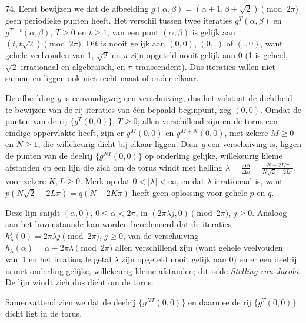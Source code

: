 \begin{problem}{74.}
    Eerst bewijzen we dat de afbeelding $g(\alpha,\beta) = (\alpha + 1,\beta + \sqrt{2}) \pmod {2 \pi}$ geen periodieke punten heeft. Het verschil tussen twee ite\-raties $g^T(\alpha,\beta)$ en $g^{T + t}(\alpha,\beta)$, $T \geq 0$ en $t \geq 1$, van een punt $(\alpha,\beta)$ is gelijk aan $(t,t \sqrt{2}) \pmod {2 \pi}$. Dit is nooit gelijk aan $(0,0)$, $(0,.)$ of $(.,0)$, want gehele veelvouden van 1, $\sqrt{2}$ en $\pi$ zijn opgeteld nooit gelijk aan 0 (1 is geheel, $\sqrt{2}$ irrationaal en algebraïsch, en $\pi$ transcendent). Dus iteraties vallen niet samen, en liggen ook niet recht naast of onder elkaar.

    De afbeelding $g$ is eenvoudigweg een verschuiving, dus het volstaat de dichtheid te bewijzen van de rij iteraties van één bepaald beginpunt, zeg $(0,0)$. Omdat de punten van de rij $\{g^T(0,0)\}$, $T \geq 0$, allen verschil\-lend zijn en de torus een eindige oppervlakte heeft, zijn er $g^M(0,0)$ en $g^{M + N}(0,0)$, met zekere $M \geq 0$ en $N \geq 1$, die willekeurig dicht bij elkaar liggen. Daar $g$ een verschuiving is, liggen de punten van de deelrij $\{g^{N T}(0,0)\}$ op onderling gelijke, willekeurig kleine afstanden op een lijn die zich om de torus windt met helling $\lambda = \frac{\Delta \alpha}{\Delta \beta} = \frac{N - 2 K \pi}{N \sqrt{2} - 2 L \pi}$, voor zekere $K,L \geq 0$. Merk op dat $0 < \lvert \lambda \rvert < \infty$, en dat $\lambda$ irrationaal is, want $p (N \sqrt{2} - 2 L \pi) = q (N - 2 K \pi)$ heeft geen oplossing voor gehele $p$ en $q$.

    Deze lijn snijdt $(\alpha,0)$, $0 \leq \alpha < 2 \pi$, in $(2 \pi \lambda j,0) \pmod {2 \pi}$, $j \geq 0$. Analoog aan het bovenstaande kan worden beredeneerd dat de ite\-raties $h^{j}_{\lambda}(0) = 2 \pi \lambda j \pmod {2 \pi}$, $j \geq 0$, van de verschuiving $h_{\lambda}(\alpha) = \alpha + 2 \pi \lambda \pmod {2 \pi}$ allen verschillend zijn (want gehele veelvouden van~1 en het irrationale getal $\lambda$ zijn opgeteld nooit gelijk aan 0) en er een deelrij is met onderling gelijke, willekeurig kleine afstanden; dit is de \textit{Stelling van Jacobi}. De lijn windt zich dus dicht om de torus.

    Samenvattend zien we dat de deelrij $\{g^{N T}(0,0)\}$ en daarmee de rij $\{g^T(0,0)\}$ dicht ligt in de torus.
\end{problem}

\clearpage


